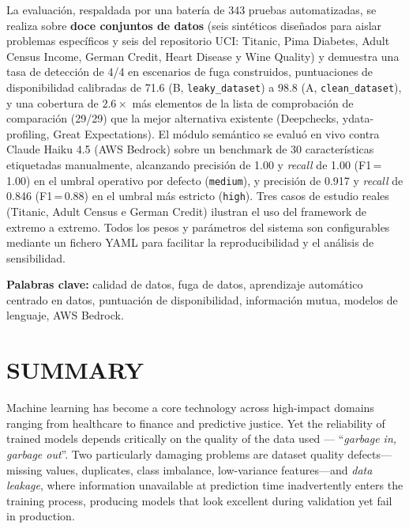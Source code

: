 \documentclass[12pt,a4paper]{report}
\begin{document}
La evaluaci\'on, respaldada por una bater\'ia de 343 pruebas automatizadas, se realiza sobre
\textbf{doce conjuntos de datos} (seis sint\'eticos dise\~{n}ados para aislar problemas
espec\'ificos y seis del repositorio UCI: Titanic, Pima Diabetes, Adult Census Income, German
Credit, Heart Disease y Wine Quality) y demuestra una tasa de detecci\'on de 4/4 en escenarios
de fuga construidos, puntuaciones de disponibilidad calibradas de 71.6 (B, \texttt{leaky\_dataset})
a 98.8 (A, \texttt{clean\_dataset}), y una cobertura de $2.6\times$ m\'as elementos de la lista de
comprobaci\'on de comparaci\'on (29/29) que la mejor alternativa existente (Deepchecks,
ydata-profiling, Great Expectations). El m\'odulo sem\'antico se evalu\'o en vivo contra
Claude Haiku 4.5 (AWS Bedrock) sobre un benchmark de 30 caracter\'isticas etiquetadas
manualmente, alcanzando precisi\'on de 1.00 y \textit{recall} de 1.00 (F1\,=\,1.00) en el
umbral operativo por defecto (\texttt{medium}), y precisi\'on de 0.917 y \textit{recall}
de 0.846 (F1\,=\,0.88) en el umbral m\'as estricto (\texttt{high}). Tres casos de estudio
reales (Titanic, Adult Census e German Credit) ilustran el uso del framework de extremo a
extremo. Todos los pesos y par\'ametros del sistema son configurables mediante un fichero
YAML para facilitar la reproducibilidad y el an\'alisis de sensibilidad.

\textbf{Palabras clave:} calidad de datos, fuga de datos, aprendizaje autom\'atico centrado
en datos, puntuaci\'on de disponibilidad, informaci\'on mutua, modelos de lenguaje, AWS Bedrock.

\chapter*{SUMMARY}

Machine learning has become a core technology across high-impact domains ranging from
healthcare to finance and predictive justice. Yet the reliability of trained models depends
critically on the quality of the data used --- ``\textit{garbage in, garbage out}''. Two
particularly damaging problems are dataset quality defects---missing values, duplicates, class
imbalance, low-variance features---and \textit{data leakage}, where information unavailable at
prediction time inadvertently enters the training process, producing models that look excellent
during validation yet fail in production.
\end{document}
